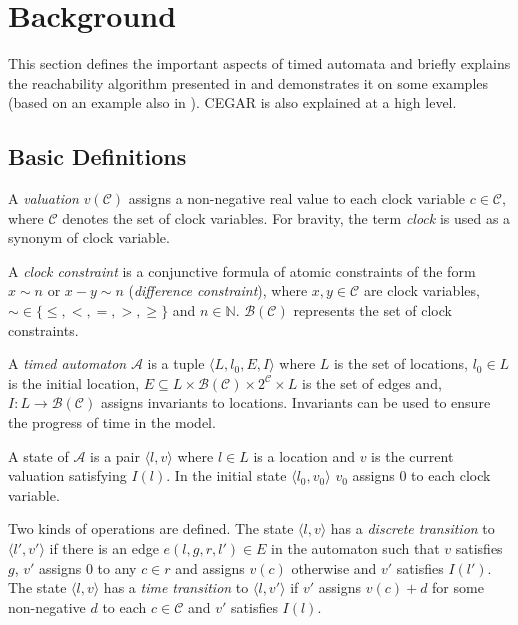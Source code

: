 \chapter{Background}
\label{chap:background}

This section defines the important aspects of timed automata and briefly
explains the reachability algorithm presented in
\cite{bengtsson2004timed} and demonstrates it on some examples (based on an example also in \cite{bengtsson2004timed}).
CEGAR is also explained at a high level.


\section{Basic Definitions}
A \emph{valuation} $v(\mathcal{C})$ assigns a non-negative real value
to each clock variable $c \in \mathcal{C}$, where $\mathcal{C}$ denotes the set of clock
variables. For bravity, the term \emph{clock} is used as a synonym of {clock variable}.

A \emph{clock constraint} is a conjunctive formula of atomic
constraints of the form $x \sim n$ or $x - y \sim n$ (\emph{difference
	constraint}), where $x,y \in \mathcal{C}$ are clock variables, $\sim \in
\{\leq,<,=,>,\geq\}$ and \hbox{$n \in \mathbb{N}$}. $\mathcal{B}(\mathcal{C})$ represents the set of clock
constraints.

A \emph{timed automaton} $\mathcal{A}$ is a tuple $\langle L, l_0,
E, I\rangle$ where
$L$ is the set of locations,
$l_0 \in L$ is the initial location,
$E \subseteq L \times \mathcal{B}(\mathcal{C}) \times 2^\mathcal{C} \times L$
is the set of edges and,
$I: L \to \mathcal{B}(\mathcal{C})$ assigns invariants to locations.  Invariants can be used to ensure the progress of time in the model.


A state of $\mathcal{A}$ is a pair $\langle l,v \rangle$ where $l \in L$ is a
location and $v$ is the current valuation satisfying $I(l)$. In the initial
state $\langle l_0,v_0 \rangle$ $v_0$ assigns 0 to each clock variable.

Two kinds of operations are defined. The state $\langle l,v \rangle$ has a
\emph{discrete transition} to $\langle l',v' \rangle$  if there is an
edge $e(l,g,r,l') \in E$ in the automaton such that $v$ satisfies $g$, $v'$ assigns 0 to any $c \in
r$ and assigns $v(c)$ otherwise and $v'$ satisfies $I(l')$. The state $\langle
l,v \rangle$ has a \emph{time transition} to $\langle l,v' \rangle$ if $v'$
assigns $v(c)+d$ for some non-negative $d$ to each $c \in \mathcal{C}$ and $v'$
satisfies $I(l)$. 


